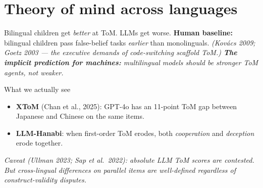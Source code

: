 \documentclass[11pt,aspectratio=169]{beamer}
\begin{document}
\section{Theory of mind across languages}

\begin{frame}{Bilingual children get \emph{better} at ToM. LLMs get worse.}
    \large
    \textbf{Human baseline:} bilingual children pass false-belief tasks \emph{earlier} than monolinguals.
    \scriptsize \itshape (Kovács 2009; Goetz 2003 --- the executive demands of code-switching scaffold ToM.)
    \vspace{0.3cm}
    \normalsize\textbf{The implicit prediction for machines:} multilingual models should be \emph{stronger} ToM agents, not weaker.
    \vspace{0.4cm}
    \begin{block}{What we actually see}
        \begin{itemize}
            \setlength\itemsep{0.3em}
            \item \textbf{XToM} (Chan et al., 2025): GPT-4o has an 11-point ToM gap between Japanese and Chinese on the same items.
            \item \textbf{LLM-Hanabi}: when first-order ToM erodes, both \emph{cooperation} and \emph{deception} erode together.
        \end{itemize}
    \end{block}
    \vspace{0.2cm}
    \footnotesize\itshape Caveat (Ullman 2023; Sap et al.\ 2022): absolute LLM ToM scores are contested. But cross-lingual \emph{differences on parallel items} are well-defined regardless of construct-validity disputes.
\end{frame}
\end{document}
